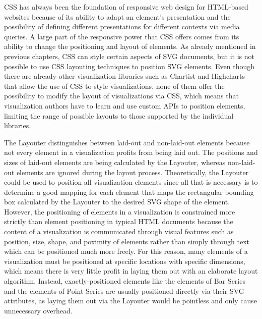 CSS has always been the foundation of responsive web design for
HTML-based websites because of its ability to adapt an element's
presentation and the possibility of defining different presentations
for different contexts via media queries.  A large part of the
responsive power that CSS offers comes from its ability to change the
positioning and layout of elements.  As already mentioned in previous
chapters, CSS can style certain aspects of SVG documents, but it is
not possible to use CSS layouting techniques to position SVG elements.
Even though there are already other visualization libraries such as
Chartist \parencite{Chartist} and Highcharts \parencite{Highcharts}
that allow the use of CSS to style visualizations, none of them offer
the possibility to modify the layout of visualizations via CSS, which
means that visualization authors have to learn and use custom APIs to
position elements, limiting the range of possible layouts to those
supported by the individual libraries.

The Layouter distinguishes between laid-out and non-laid-out elements
because not every element in a visualization profits from being laid
out.  The positions and sizes of laid-out elements are being
calculated by the Layouter, whereas non-laid-out elements are ignored
during the layout process.  Theoretically, the Layouter could be used
to position all visualization elements since all that is necessary is
to determine a good mapping for each element that maps the rectangular
bounding box calculated by the Layouter to the desired SVG shape of
the element.  However, the positioning of elements in a visualization
is constrained more strictly than element positioning in typical HTML
documents because the content of a visualization is communicated
through visual features such as position, size, shape, and poximity of
elements rather than simply through text which can be positioned much
more freely.  For this reason, many elements of a visualization must
be positioned at specific locations with specific dimensions, which
means there is very little profit in laying them out with an elaborate
layout algorithm.  Instead, exactly-positioned elements like the
 elements of Bar Series and the  elements
of Point Series are usually positioned directly via their SVG
attributes, as laying them out via the Layouter would be pointless and
only cause unnecessary overhead.

